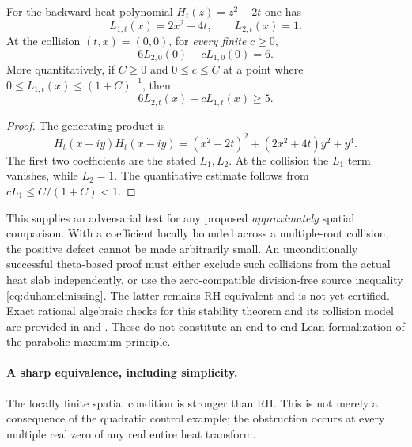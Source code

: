 \begin{proposition}
\label{prop:collisiondefect}
For the backward heat polynomial
$H_t(z)=z^2-2t$ one has
\[
L_{1,t}(x)=2x^2+4t,\qquad L_{2,t}(x)=1.
\]
At the collision $(t,x)=(0,0)$,
for \emph{every finite} $c\ge0$,
\[
6L_{2,0}(0)-cL_{1,0}(0)=6 .
\]
More quantitatively, if $C\ge0$ and
$0\le c\le C$ at a point where
$0\le L_{1,t}(x)\le(1+C)^{-1}$, then
\[
6L_{2,t}(x)-cL_{1,t}(x)\ge5.
\]
\end{proposition}
\begin{proof}
The generating product is
\[
H_t(x+iy)H_t(x-iy)
=(x^2-2t)^2+(2x^2+4t)y^2+y^4.
\]
The first two coefficients are the stated
$L_1,L_2$. At the collision the
$L_1$ term vanishes, while $L_2=1$.
The quantitative estimate follows from
$cL_1\le C/(1+C)<1$.
\end{proof}

This supplies an adversarial test for any
proposed \emph{approximately}
spatial comparison. With a coefficient
locally bounded across a multiple-root
collision, the positive defect cannot
be made arbitrarily small. An
unconditionally successful theta-based
proof must either exclude such collisions
from the actual heat slab independently,
or use the zero-compatible
division-free source inequality
\eqref{eq:duhamelmissing}. The latter
remains RH-equivalent and is not yet
certified. Exact rational algebraic
checks for this stability theorem and
its collision model are provided in
and
.
These do not constitute an end-to-end
Lean formalization of the parabolic
maximum principle.

\paragraph{A sharp equivalence, including simplicity.}
The locally finite spatial condition is stronger
than RH. This is not merely a consequence of
the quadratic control example; the obstruction
occurs at every multiple real zero of any
real entire heat transform.

